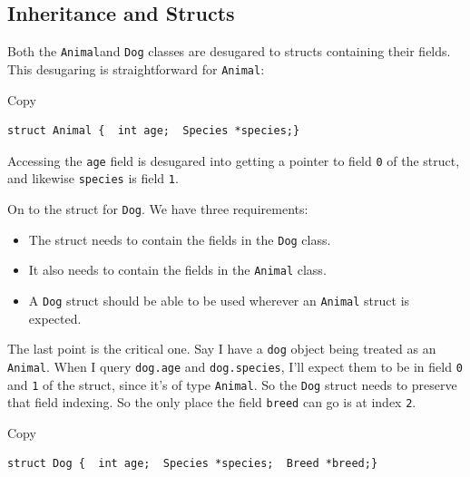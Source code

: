 \hypertarget{inheritance-and-structs}{%
\subsection{\texorpdfstring{\protect\hyperlink{inheritance-and-structs}{}Inheritance
and Structs}{Inheritance and Structs}}\label{inheritance-and-structs}}

Both the \texttt{Animal}and \texttt{Dog} classes are desugared to
structs containing their fields. This desugaring is straightforward for
\texttt{Animal}:

Copy

\begin{verbatim}
struct Animal {  int age;  Species *species;}
\end{verbatim}

Accessing the \texttt{age} field is desugared into getting a pointer to
field \texttt{0} of the struct, and likewise \texttt{species} is field
\texttt{1}.

On to the struct for \texttt{Dog}. We have three requirements:

\begin{itemize}
\tightlist
\item
  The struct needs to contain the fields in the \texttt{Dog} class.
\item
  It also needs to contain the fields in the \texttt{Animal} class.
\item
  A \texttt{Dog} struct should be able to be used wherever an
  \texttt{Animal} struct is expected.
\end{itemize}

The last point is the critical one. Say I have a \texttt{dog} object
being treated as an \texttt{Animal}. When I query \texttt{dog.age} and
\texttt{dog.species}, I'll expect them to be in field \texttt{0} and
\texttt{1} of the struct, since it's of type \texttt{Animal}. So the
\texttt{Dog} struct needs to preserve that field indexing. So the only
place the field \texttt{breed} can go is at index \texttt{2}.

Copy

\begin{verbatim}
struct Dog {  int age;  Species *species;  Breed *breed;}
\end{verbatim}

